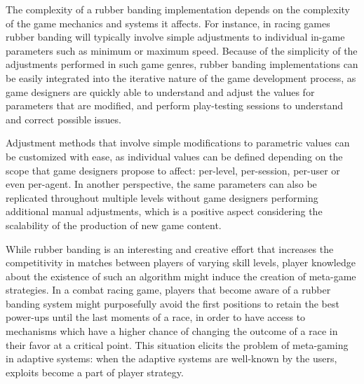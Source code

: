 The complexity of a rubber banding implementation depends on the complexity of the game mechanics and systems it affects. For instance, in racing games rubber banding will typically involve simple adjustments to individual in-game parameters such as minimum or maximum speed. Because of the simplicity of the adjustments performed in such game genres, rubber banding implementations can be easily integrated into the iterative nature of the game development process, as game designers are quickly able to understand and adjust the values for parameters that are modified, and perform play-testing sessions to understand and correct possible issues.

Adjustment methods that involve simple modifications to parametric values can be customized with ease, as individual values can be defined depending on the scope that game designers propose to affect: per-level, per-session, per-user or even per-agent. In another perspective, the same parameters can also be replicated throughout multiple levels without game designers performing additional manual adjustments, which is a positive aspect considering the scalability of the production of new game content.


While rubber banding is an interesting and creative effort that increases the competitivity in matches between players of varying skill levels, player knowledge about the existence of such an algorithm might induce the creation of meta-game strategies. In a combat racing game, players that become aware of a rubber banding system might purposefully avoid the first positions to retain the best power-ups until the last moments of a race, in order to have access to mechanisms which have a higher chance of changing the outcome of a race in their favor at a critical point. This situation elicits the problem of meta-gaming in adaptive systems: when the adaptive systems are well-known by the users, exploits become a part of player strategy.


